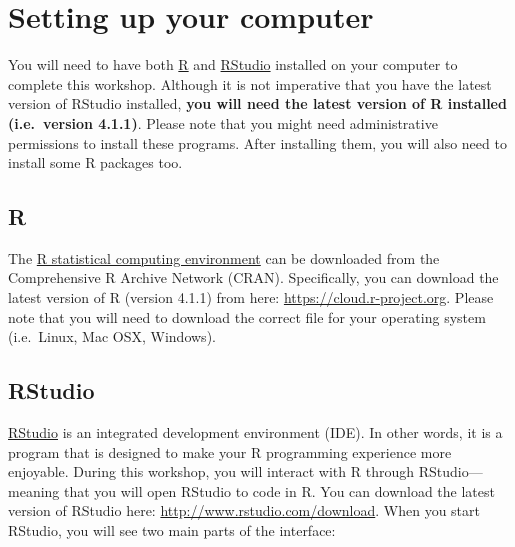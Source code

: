 \documentclass[
  12pt,
]{book}
\begin{document}
\hypertarget{setup}{%
\section{Setting up your computer}\label{setup}}

You will need to have both \href{https://www.r-project.org}{R} and \href{https://www.rstudio.com/}{RStudio} installed on your computer to complete this workshop. Although it is not imperative that you have the latest version of RStudio installed, \textbf{you will need the latest version of R installed (i.e.~version 4.1.1)}. Please note that you might need administrative permissions to install these programs. After installing them, you will also need to install some R packages too.

\hypertarget{r}{%
\subsection{R}\label{r}}

The \href{https://www.r-project.org}{R statistical computing environment} can be downloaded from the Comprehensive R Archive Network (CRAN). Specifically, you can download the latest version of R (version 4.1.1) from here: \url{https://cloud.r-project.org}. Please note that you will need to download the correct file for your operating system (i.e.~Linux, Mac OSX, Windows).

\hypertarget{rstudio}{%
\subsection{RStudio}\label{rstudio}}

\href{https://www.rstudio.com}{RStudio} is an integrated development environment (IDE). In other words, it is a program that is designed to make your R programming experience more enjoyable. During this workshop, you will interact with R through RStudio---meaning that you will open RStudio to code in R. You can download the latest version of RStudio here: \url{http://www.rstudio.com/download}. When you start RStudio, you will see two main parts of the interface:
\end{document}
